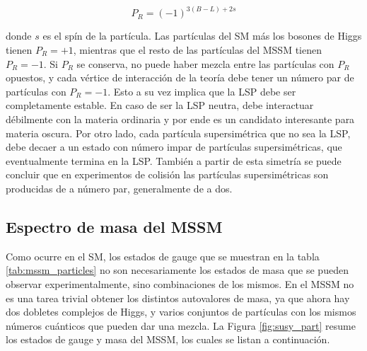 \begin{equation}
	P_R = (-1)^{3(B-L)+2s}
\end{equation}

\noindent
donde $s$ es el spín de la partícula. Las partículas del SM más los bosones de Higgs tienen $P_R = +1$, mientras que el resto de las partículas del MSSM tienen $P_R = -1$. Si $P_R$ se conserva, no puede haber mezcla entre las partículas con $P_R$ opuestos, y cada vértice de interacción de la teoría debe tener un número par de partículas con $P_R=-1$. Esto a su vez implica que la LSP debe ser completamente estable. En caso de ser la LSP neutra, debe interactuar débilmente con la materia ordinaria y por ende es un candidato interesante para materia oscura. Por otro lado, cada partícula supersimétrica que no sea la LSP, debe decaer a un estado con número impar de partículas supersimétricas, que eventualmente termina en la LSP. También a partir de esta simetría se puede concluir que en experimentos de colisión las partículas supersimétricas son producidas de a número par, generalmente de a dos.



\subsection{Espectro de masa del MSSM}

Como ocurre en el SM, los estados de gauge que se muestran en la tabla \ref{tab:mssm_particles} no son necesariamente los estados de masa que se pueden observar experimentalmente, sino combinaciones de los mismos. En el MSSM no es una tarea trivial obtener los distintos autovalores de masa, ya que ahora hay dos dobletes complejos de Higgs, y varios conjuntos de partículas con los mismos números cuánticos que pueden dar una mezcla. La Figura \ref{fig:susy_part} resume los estados de gauge y masa del MSSM, los cuales se listan a continuación.

